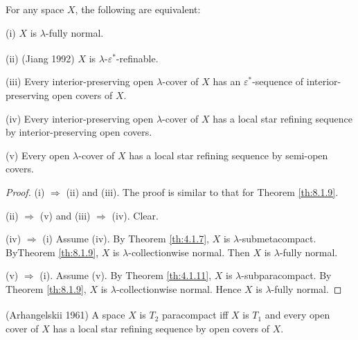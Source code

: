 \documentclass[jiang8iv.tex]{subfiles}
\begin{document}
{\theorem{\label{th:8.2.11}}
For any space $X$, the following are equivalent:

\textup{(i)}  \(X\) is \(\lambda\)-fully normal.

\textup{(ii)}  \textup{(\hstretch{1.8}{[}Jiang 1992\hstretch{1.8}{]}\textsuperscript{\cite{Jiang1992}})} 
 \(X\) is \(\lambda\)-\(\varepsilon^*\)-refinable.

\textup{(iii)}   Every interior-preserving open \(\lambda\)-cover of \(X\) has an $\varepsilon^*$-sequence of interior-preserving  open covers of \(X\).

\textup{(iv)}  Every  interior-preserving open \(\lambda\)-cover of \(X\) has a local star refining sequence by  interior-preserving open covers.

\textup{(v)}  Every open \(\lambda\)-cover of \(X\) has a local star refining sequence by semi-open covers.
}

\begin{proof} 
(i) \(\Rightarrow\) (ii) and (iii). The proof 
is similar  to that for  Theorem \ref{th:8.1.9}.

(ii) \(\Rightarrow\) (v) and (iii) \(\Rightarrow\) (iv). Clear.

(iv) \(\Rightarrow\) (i) Assume (iv). By Theorem \ref{th:4.1.7}, $X$ is 
$\lambda$-submetacompact. ByTheorem \ref{th:8.1.9}, $X$ is $\lambda$-collectionwise
normal. Then $X$ is $\lambda$-fully normal. 

(v) \(\Rightarrow\) (i). Assume (v). By Theorem \ref{th:4.1.11}, $X$ 
is $\lambda$-subparacompact. By Theorem \ref{th:8.1.9}, $X$ is
$\lambda$-collectionwise normal. Hence $X$ is $\lambda$-fully normal.
\end{proof}

{\corollary{} \label{cor:8.2.12}
 \textup{(\hstretch{1.8}{[}Arhangelskii 1961\hstretch{1.8}{]}\textsuperscript{\cite{Arhangelski1961}})}
A space $X$ is $T_2$ paracompact  iff $X$ is $T_1$ and every open cover of $X$ has a local star refining sequence by open covers of $X$.\hfill\qedsymbol
}
\end{document}
